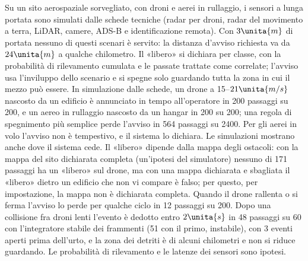 Su un sito aerospaziale sorvegliato, con droni e aerei in rullaggio, i sensori a lunga portata sono simulati dalle schede tecniche (radar per droni, radar del movimento a terra, LiDAR, camere, ADS-B e identificazione remota). Con $3\unita{m}$ di portata nessuno di questi scenari è servito: la distanza d'avviso richiesta va da $24\unita{m}$ a qualche chilometro. Il «libero» si dichiara per classe, con la probabilità di rilevamento cumulata e le passate trattate come correlate; l'avviso usa l'inviluppo dello scenario e si spegne solo guardando tutta la zona in cui il mezzo può essere. In simulazione dalle schede, un drone a 15--$21\unita{m/s}$ nascosto da un edificio è annunciato in tempo all'operatore in 200 passaggi su 200, e un aereo in rullaggio nascosto da un hangar in 200 su 200; una regola di spegnimento più semplice perde l'avviso in 564 passaggi su 2400. Per gli aerei in volo l'avviso non è tempestivo, e il sistema lo dichiara.
Le simulazioni mostrano anche dove il sistema cede. Il «libero» dipende dalla mappa degli ostacoli: con la mappa del sito dichiarata completa (un'ipotesi del simulatore) nessuno di 171 passaggi ha un «libero» sul drone, ma con una mappa dichiarata e sbagliata il «libero» dietro un edificio che non vi compare è falso; per questo, per impostazione, la mappa non è dichiarata completa. Quando il drone rallenta o si ferma l'avviso lo perde per qualche ciclo in 12 passaggi su 200. Dopo una collisione fra droni lenti l'evento è dedotto entro $2\unita{s}$ in 48 passaggi su 60 con l'integratore stabile dei frammenti (51 con il primo, instabile), con 3 eventi aperti prima dell'urto, e la zona dei detriti è di alcuni chilometri e non si riduce guardando. Le probabilità di rilevamento e le latenze dei sensori sono ipotesi.
